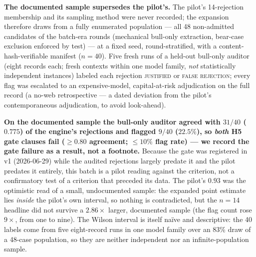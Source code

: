 \documentclass[11pt]{article}
\begin{document}
\noindent \textbf{The documented sample supersedes the pilot's.} The pilot's 14-rejection membership
and its sampling method were never recorded; the expansion therefore draws from a fully enumerated
population --- all 48 non-admitted candidates of the batch-era rounds (mechanical bull-only extraction,
bear-case exclusion enforced by test) --- at a fixed seed, round-stratified, with a
content-hash-verifiable manifest ($n{=}40$). Five fresh runs of a held-out bull-only auditor (eight
records each; fresh contexts within one model family, \emph{not} statistically independent instances)
labeled each rejection \textsc{justified} or \textsc{false rejection}; every flag was escalated
to an expensive-model, capital-at-risk adjudication on the full record (a no-web retrospective --- a
dated deviation from the pilot's contemporaneous adjudication, to avoid look-ahead).

\textbf{On the documented sample the bull-only auditor agreed with $31/40$ ($0.775$) of the engine's
rejections and flagged $9/40$ ($22.5\%$), so \emph{both} H5 gate clauses fail ($\geq 0.80$
agreement; $\leq 10\%$ flag rate) --- we record the gate failure as a result, not a footnote.}
Because the gate was registered in v1 (2026-06-29) while the audited rejections largely predate it
and the pilot predates it entirely, this batch is a pilot reading against the criterion, not a
confirmatory test of a criterion that preceded its data. The
pilot's $0.93$ was the optimistic read of a small, undocumented sample: the expanded point estimate
lies \emph{inside} the pilot's own interval, so nothing is contradicted, but the $n{=}14$ headline
did not survive a $2.86\times$ larger, documented sample (the flag count rose $9\times$, from one to
nine). The Wilson interval is itself na\"ive and descriptive: the 40 labels come from five
eight-record runs in one model family over an 83\% draw of a 48-case population, so they are neither
independent nor an infinite-population sample.
\end{document}
